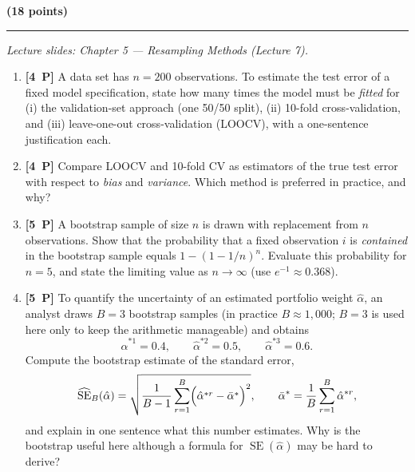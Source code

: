 \documentclass[11pt,a4paper]{article}
\newcommand{\problem}[2]{\par\vspace{7mm}\noindent{\large\textbf{Problem #1}}%
  \hfill{\large\textbf{(#2 points)}}\par\nopagebreak\vspace{0.6mm}%
  \noindent\rule{\textwidth}{0.6pt}\par\nopagebreak\vspace{2.5mm}}
\newcommand{\pp}[1]{\textbf{[#1~P]}\enspace}
\begin{document}
\problem{4: Resampling methods}{18}
{\small\itshape Lecture slides: Chapter 5 --- Resampling Methods (Lecture 7).}\par\vspace{1mm}

\begin{enumerate}[label=(\alph*),leftmargin=7mm,itemsep=2.5mm]
  \item \pp{4} A data set has $n=200$ observations. To estimate the test error of a fixed
    model specification, state how many times the model must be \emph{fitted} for (i) the
    validation-set approach (one 50/50 split), (ii) 10-fold cross-validation, and (iii)
    leave-one-out cross-validation (LOOCV), with a one-sentence justification each.
  \item \pp{4} Compare LOOCV and 10-fold CV as estimators of the true test error with
    respect to \emph{bias} and \emph{variance}. Which method is preferred in practice, and
    why?
  \item \pp{5} A bootstrap sample of size $n$ is drawn with replacement from $n$
    observations. Show that the probability that a fixed observation $i$ is
    \emph{contained} in the bootstrap sample equals $1-(1-1/n)^n$. Evaluate this
    probability for $n=5$, and state the limiting value as $n\to\infty$
    (use $e^{-1}\approx 0.368$).
  \item \pp{5} To quantify the uncertainty of an estimated portfolio weight
    $\hat{\alpha}$, an analyst draws $B=3$ bootstrap samples (in practice $B\approx 1{,}000$;
    $B=3$ is used here only to keep the arithmetic manageable) and obtains
    \[
    \hat{\alpha}^{*1}=0.4,\qquad \hat{\alpha}^{*2}=0.5,\qquad \hat{\alpha}^{*3}=0.6 .
    \]
    Compute the bootstrap estimate of the standard error,
    \[
    \widehat{\operatorname{SE}}_B(\hat{\alpha})
      =\sqrt{\frac{1}{B-1}\sum_{r=1}^{B}\Bigl(\hat{\alpha}^{*r}-\bar{\alpha}^{*}\Bigr)^{2}},
    \qquad
    \bar{\alpha}^{*}=\frac{1}{B}\sum_{r=1}^{B}\hat{\alpha}^{*r},
    \]
    and explain in one sentence what this number estimates. Why is the bootstrap useful
    here although a formula for $\operatorname{SE}(\hat{\alpha})$ may be hard to derive?
\end{enumerate}
\end{document}
